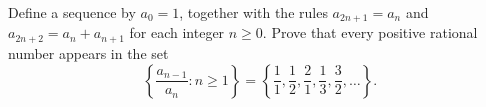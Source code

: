 Define a sequence by $a_0=1$, together with the rules
$a_{2n+1} = a_n$ and $a_{2n+2} = a_n + a_{n+1}$ for each
integer $n \geq 0$. Prove that every positive rational number
appears in the set
\[
\left\{ \frac{a_{n-1}}{a_n}: n \geq 1 \right\} =
\left\{ \frac{1}{1}, \frac{1}{2}, \frac{2}{1}, \frac{1}{3},
\frac{3}{2}, \dots \right\}.
\]

